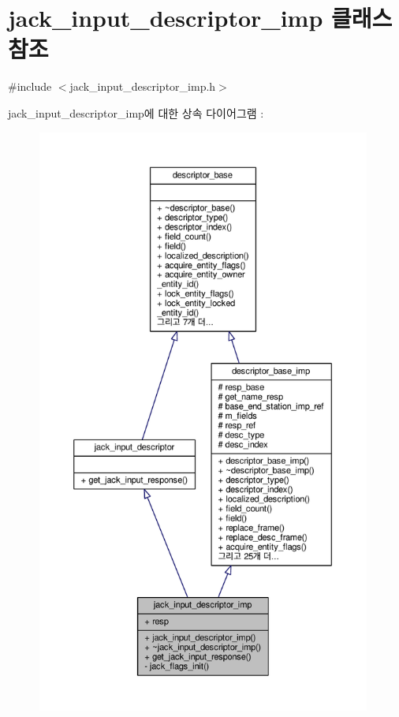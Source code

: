\hypertarget{classavdecc__lib_1_1jack__input__descriptor__imp}{}\section{jack\+\_\+input\+\_\+descriptor\+\_\+imp 클래스 참조}
\label{classavdecc__lib_1_1jack__input__descriptor__imp}


{\ttfamily \#include $<$jack\+\_\+input\+\_\+descriptor\+\_\+imp.\+h$>$}



jack\+\_\+input\+\_\+descriptor\+\_\+imp에 대한 상속 다이어그램 \+: 
\nopagebreak
\begin{figure}[H]
\begin{center}
\leavevmode
\includegraphics[height=550pt]{classavdecc__lib_1_1jack__input__descriptor__imp__inherit__graph}
\end{center}
\end{figure}



